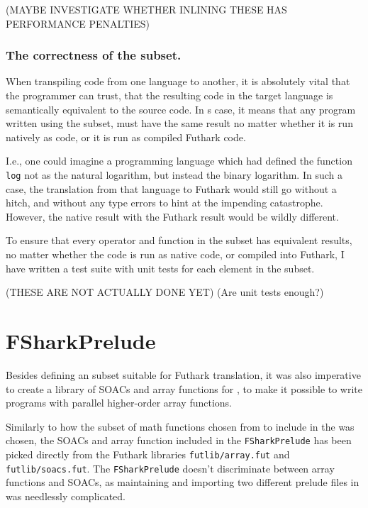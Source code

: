 (MAYBE INVESTIGATE WHETHER INLINING THESE HAS PERFORMANCE PENALTIES) 


\subsection*{The correctness of the \fshark{} subset.}
When transpiling code from one language to another, it is absolutely vital that
the programmer can trust, that the resulting code in the target language is
semantically equivalent to the source code.
In \fshark{}s case, it means that any program written using the \fshark{}
subset, must have the same result no matter whether it is run natively as
\fsharp{} code, or it is run as \fshark{} compiled Futhark code.

I.e., one could imagine a programming language which had defined the function
\texttt{log} not as the natural logarithm, but instead the binary logarithm. In
such a case, the translation from that language to Futhark would still go
without a hitch, and without any type errors to hint at the impending
catastrophe.
However, the native result with the Futhark result would be wildly different.

To ensure that every operator and function in the \fshark{} subset has
equivalent results, no matter whether the \fshark{} code is run as native
\fsharp{} code, or compiled into Futhark, I have written a test suite with unit
tests for each element in the \fsharp{} subset. 


(THESE ARE NOT ACTUALLY DONE YET)
(Are unit tests enough?)





\chapter{FSharkPrelude}
Besides defining an \fsharp{} subset suitable for Futhark translation, it was
also imperative to create a library of SOACs and array functions for \fshark{},
to make it possible to write programs with parallel higher-order array
functions.

Similarly to how the subset of math functions chosen from \fsharp{} to include in
the \fshark{} was chosen, the SOACs and array function included in the
\texttt{FSharkPrelude} has been picked directly from the Futhark libraries
\texttt{futlib/array.fut} and \texttt{futlib/soacs.fut}. The \texttt{FSharkPrelude} doesn't
discriminate between array functions and SOACs, as maintaining and importing two
different prelude files in \fshark{} was needlessly complicated.

